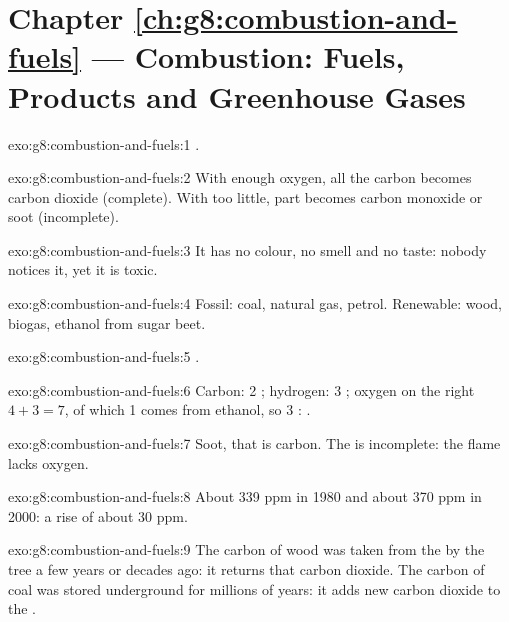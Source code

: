 \section*{Chapter \ref{ch:g8:combustion-and-fuels} --- Combustion: Fuels, Products and Greenhouse Gases}

\begin{solution}{exo:g8:combustion-and-fuels:1}
.
\end{solution}

\begin{solution}{exo:g8:combustion-and-fuels:2}
With enough oxygen, all the carbon becomes carbon dioxide (complete).
With too little, part becomes carbon monoxide or soot (incomplete).
\end{solution}

\begin{solution}{exo:g8:combustion-and-fuels:3}
It has no colour, no smell and no taste: nobody notices it, yet it is
toxic.
\end{solution}

\begin{solution}{exo:g8:combustion-and-fuels:4}
Fossil: coal, natural gas, petrol. Renewable: wood, biogas, ethanol from
sugar beet.
\end{solution}

\begin{solution}{exo:g8:combustion-and-fuels:5}
.
\end{solution}

\begin{solution}{exo:g8:combustion-and-fuels:6}
Carbon: 2 ; hydrogen: 3 ; oxygen on the right $4 + 3 =
7$, of which 1 comes from ethanol, so 3 :
.
\end{solution}

\begin{solution}{exo:g8:combustion-and-fuels:7}
Soot, that is carbon. The  is incomplete: the flame lacks
oxygen.
\end{solution}

\begin{solution}{exo:g8:combustion-and-fuels:8}
About 339 ppm in 1980 and about 370 ppm in 2000: a rise of about 30 ppm.
\end{solution}

\begin{solution}{exo:g8:combustion-and-fuels:9}
The carbon of wood was taken from the  by the tree a few years or
decades ago:  it returns that carbon dioxide. The carbon of coal
was stored underground for millions of years:  it adds new carbon
dioxide to the .
\end{solution}

